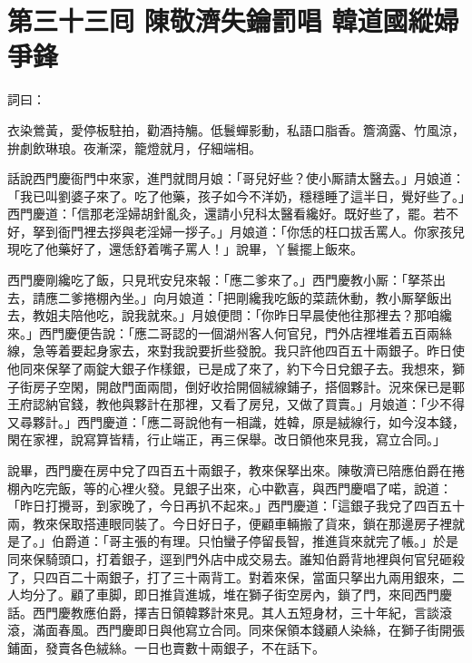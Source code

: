 
\chapter*{第三十三囘 陳敬濟失鑰罰唱 韓道國縱婦爭鋒}


詞曰：

\begin{myquote} 
衣染鶯黃，愛停板駐拍，勸酒持觴。低鬟蟬影動，私語口脂香。簷滴露、竹風涼，拚劇飲琳琅。夜漸深，籠燈就月，仔細端相。

\end{myquote} 

話說西門慶衙門中來家，進門就問月娘：「哥兒好些？使小厮請太醫去。」月娘道：「我已叫劉婆子來了。吃了他藥，孩子如今不洋奶，穩穩睡了這半日，覺好些了。」西門慶道：「信那老淫婦胡針亂灸，還請小兒科太醫看纔好。既好些了，罷。若不好，拏到衙門裡去拶與老淫婦一拶子。」月娘道：「你恁的枉口拔舌罵人。你家孩兒現吃了他藥好了，還恁舒着嘴子罵人！」說畢，丫鬟擺上飯來。

西門慶剛纔吃了飯，只見玳安兒來報：「應二爹來了。」西門慶教小厮：「拏茶出去，請應二爹捲棚內坐。」向月娘道：「把剛纔我吃飯的菜蔬休動，教小厮拏飯出去，教姐夫陪他吃，說我就來。」月娘便問：「你昨日早晨使他往那裡去？那咱纔來。」西門慶便告說：「應二哥認的一個湖州客人何官兒，門外店裡堆着五百兩絲線，急等着要起身家去，來對我說要折些發脫。我只許他四百五十兩銀子。昨日使他同來保拏了兩錠大銀子作樣銀，已是成了來了，約下今日兌銀子去。我想來，獅子街房子空閑，開啟門面兩間，倒好收拾開個絨線鋪子，搭個夥計。況來保已是鄆王府認納官錢，教他與夥計在那裡，又看了房兒，又做了買賣。」月娘道：「少不得又尋夥計。」西門慶道：「應二哥說他有一相識，姓韓，原是絨線行，如今沒本錢，閑在家裡，說寫算皆精，行止端正，再三保舉。改日領他來見我，寫立合同。」

說畢，西門慶在房中兌了四百五十兩銀子，教來保拏出來。陳敬濟已陪應伯爵在捲棚內吃完飯，等的心裡火發。見銀子出來，心中歡喜，與西門慶唱了喏，說道：「昨日打攪哥，到家晚了，今日再扒不起來。」西門慶道：「這銀子我兌了四百五十兩，教來保取搭連眼同裝了。今日好日子，便顧車輛搬了貨來，鎖在那邊房子裡就是了。」伯爵道：「哥主張的有理。只怕蠻子停留長智，推進貨來就完了帳。」於是同來保騎頭口，打着銀子，逕到門外店中成交易去。誰知伯爵背地裡與何官兒砸殺了，只四百二十兩銀子，打了三十兩背工。對着來保，當面只拏出九兩用銀來，二人均分了。顧了車脚，即日推貨進城，堆在獅子街空房內，鎖了門，來囘西門慶話。西門慶教應伯爵，擇吉日領韓夥計來見。其人五短身材，三十年紀，言談滾滾，滿面春風。西門慶即日與他寫立合同。同來保領本錢顧人染絲，在獅子街開張鋪面，發賣各色絨絲。一日也賣數十兩銀子，不在話下。

